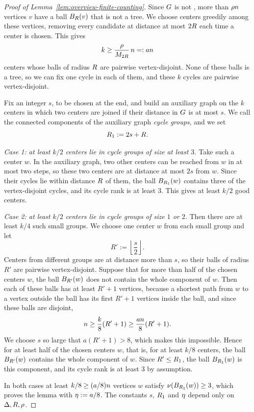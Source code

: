\begin{proof}[Proof of Lemma~\ref{lem:overview-finite-counting}]
Since \(G\) is not \loctree{\rad}{\nontree}, more than \(\rho n\)
vertices \(v\) have a ball \(B_{R}(v)\) that is not a tree. We choose
centers greedily among these vertices, removing every candidate at distance at
most \(2R\) each time a center is chosen. This gives
\[
  k\ge\frac{\rho}{M_{2R}}\,n=:an
\]
centers whose balls of radius \(R\) are pairwise vertex-disjoint. None of
these balls is a tree, so we can fix one cycle in each of them, and these \(k\)
cycles are pairwise vertex-disjoint.

Fix an integer \(s\), to be chosen at the end, and build an auxiliary graph on
the \(k\) centers in which two centers are joined if their distance in \(G\)
is at most \(s\). We call the connected components of the auxiliary graph
\emph{cycle groups}, and we set
\[
  R_1:=2s+R .
\]

\emph{Case 1: at least \(k/2\) centers lie in cycle groups of size at least
\(3\).} Take such a center \(w\). In the auxiliary graph, two other centers can
be reached from \(w\) in at most two steps, so these two centers are at
distance at most \(2s\) from \(w\). Since their cycles lie within distance
\(R\) of them, the ball \(B_{R_1}(w)\) contains three of the
vertex-disjoint cycles, and its cycle rank is at least \(3\). This gives at
least \(k/2\) good centers.

\emph{Case 2: at least \(k/2\) centers lie in cycle groups of size \(1\) or
\(2\).} Then there are at least \(k/4\) such small groups. We choose one center
\(w\) from each small group and let
\[
  R':=\left\lfloor\frac s2\right\rfloor.
\]
Centers from different groups are at distance more than \(s\), so their balls
of radius \(R'\) are pairwise vertex-disjoint. Suppose that for more than half
of the chosen centers \(w\), the ball \(B_{R'}(w)\) does not contain the
whole component of \(w\). Then each of these balls has at least \(R'+1\)
vertices, because a shortest path from \(w\) to a vertex outside the ball has
its first \(R'+1\) vertices inside the ball, and since these balls are
disjoint,
\[
  n\ge\frac{k}{8}(R'+1)
  \ge\frac{an}{8}(R'+1).
\]
We choose \(s\) so large that \(a(R'+1)>8\), which makes this impossible.
Hence for at least half of the chosen centers \(w\), that is, for at least
\(k/8\) centers, the ball \(B_{R'}(w)\) contains the whole component of
\(w\). Since \(R'\le R_1\), the ball \(B_{R_1}(w)\) is this component,
and its cycle rank is at least \(3\) by assumption.

In both cases at least \(k/8\ge(a/8)n\) vertices \(w\) satisfy
\(\nu(B_{R_1}(w))\ge3\), which proves the lemma with \(\eta:=a/8\). The
constants \(s\), \(R_1\) and \(\eta\) depend only on \(\Delta,R,\rho\).
\end{proof}
